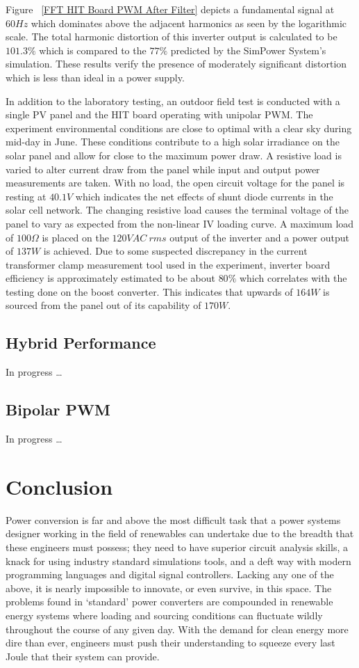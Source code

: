 Figure ~\ref{FFT HIT Board PWM After Filter} depicts a fundamental signal at $60 Hz$ which dominates above the adjacent harmonics as seen by the logarithmic scale. The total harmonic distortion of this inverter output is calculated to be $101.3\%$ which is compared to the $77\%$ predicted by the SimPower System's simulation. These results verify the presence of moderately significant distortion which is less than ideal in a power supply. 

In addition to the laboratory testing, an outdoor field test is conducted with a single PV panel and the HIT board operating with unipolar PWM. The experiment environmental conditions are close to optimal with a clear sky during mid-day in June. These conditions contribute to a high solar irradiance on the solar panel and allow for close to the maximum power draw. A resistive load is varied to alter current draw from the panel while input and output power measurements are taken. With no load, the open circuit voltage for the panel is resting at $40.1V$ which indicates the net effects of shunt diode currents in the solar cell network. The changing resistive load causes the terminal voltage of the panel to vary as expected from the non-linear IV loading curve. A maximum load of $100\Omega$ is placed on the $120VAC~ rms$ output of the inverter and a power output of $137W$ is achieved. Due to some suspected discrepancy in the current transformer clamp measurement tool used in the experiment, inverter board efficiency is approximately estimated to be about $80\%$ which correlates with the testing done on the boost converter. This indicates that upwards of $164W$ is sourced from the panel out of its capability of $170W$. 
  

\subsection{Hybrid Performance}
In progress \ldots
\subsection{Bipolar PWM}
In progress \ldots

\section{Conclusion}
Power conversion is far and above the most difficult task that a power systems designer working in the field of renewables can undertake due to the breadth that these engineers must possess; they need to have superior circuit analysis skills, a knack for using industry standard simulations tools, and a deft way with modern programming languages and digital signal controllers. Lacking any one of the above, it is nearly impossible to innovate, or even survive, in this space. The problems found in `standard' power converters are compounded in renewable energy systems where loading and sourcing conditions can fluctuate wildly throughout the course of any given day. With the demand for clean energy more dire than ever, engineers must push their understanding to squeeze every last Joule that their system can provide.

